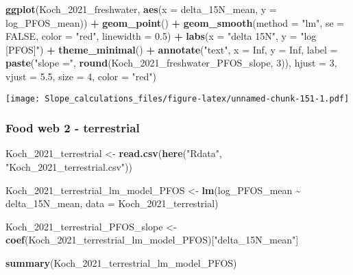 \documentclass[
]{article}
\newenvironment{Shaded}{\begin{snugshade}}{\end{snugshade}}
\newcommand{\AttributeTok}[1]{\textcolor[rgb]{0.13,0.29,0.53}{#1}}
\newcommand{\ConstantTok}[1]{\textcolor[rgb]{0.56,0.35,0.01}{#1}}
\newcommand{\DecValTok}[1]{\textcolor[rgb]{0.00,0.00,0.81}{#1}}
\newcommand{\FloatTok}[1]{\textcolor[rgb]{0.00,0.00,0.81}{#1}}
\newcommand{\FunctionTok}[1]{\textcolor[rgb]{0.13,0.29,0.53}{\textbf{#1}}}
\newcommand{\NormalTok}[1]{#1}
\newcommand{\OtherTok}[1]{\textcolor[rgb]{0.56,0.35,0.01}{#1}}
\newcommand{\SpecialCharTok}[1]{\textcolor[rgb]{0.81,0.36,0.00}{\textbf{#1}}}
\newcommand{\StringTok}[1]{\textcolor[rgb]{0.31,0.60,0.02}{#1}}
\begin{document}
\begin{Shaded}
\begin{Highlighting}[]
\FunctionTok{ggplot}\NormalTok{(Koch\_2021\_freshwater, }\FunctionTok{aes}\NormalTok{(}\AttributeTok{x =}\NormalTok{ delta\_15N\_mean, }\AttributeTok{y =}\NormalTok{ log\_PFOS\_mean)) }\SpecialCharTok{+}
  \FunctionTok{geom\_point}\NormalTok{() }\SpecialCharTok{+}
  \FunctionTok{geom\_smooth}\NormalTok{(}\AttributeTok{method =} \StringTok{"lm"}\NormalTok{, }\AttributeTok{se =} \ConstantTok{FALSE}\NormalTok{, }\AttributeTok{color =} \StringTok{"red"}\NormalTok{, }\AttributeTok{linewidth =} \FloatTok{0.5}\NormalTok{) }\SpecialCharTok{+}
  \FunctionTok{labs}\NormalTok{(}\AttributeTok{x =} \StringTok{"delta 15N"}\NormalTok{,}
       \AttributeTok{y =} \StringTok{"log [PFOS]"}\NormalTok{) }\SpecialCharTok{+}
  \FunctionTok{theme\_minimal}\NormalTok{() }\SpecialCharTok{+}
  \FunctionTok{annotate}\NormalTok{(}\StringTok{"text"}\NormalTok{, }\AttributeTok{x =} \ConstantTok{Inf}\NormalTok{, }\AttributeTok{y =} \ConstantTok{Inf}\NormalTok{, }\AttributeTok{label =} \FunctionTok{paste}\NormalTok{(}\StringTok{"slope ="}\NormalTok{, }\FunctionTok{round}\NormalTok{(Koch\_2021\_freshwater\_PFOS\_slope, }\DecValTok{3}\NormalTok{)), }
           \AttributeTok{hjust =} \DecValTok{3}\NormalTok{, }\AttributeTok{vjust =} \FloatTok{5.5}\NormalTok{, }\AttributeTok{size =} \DecValTok{4}\NormalTok{, }\AttributeTok{color =} \StringTok{"red"}\NormalTok{)}
\end{Highlighting}
\end{Shaded}

\texttt{[image: Slope\_calculations\_files/figure-latex/unnamed-chunk-151-1.pdf]}

\subsubsection{Food web 2 - terrestrial}\label{food-web-2---terrestrial}

\begin{Shaded}
\begin{Highlighting}[]
\NormalTok{Koch\_2021\_terrestrial }\OtherTok{\textless{}{-}} \FunctionTok{read.csv}\NormalTok{(}\FunctionTok{here}\NormalTok{(}\StringTok{"Rdata"}\NormalTok{, }\StringTok{"Koch\_2021\_terrestrial.csv"}\NormalTok{))}

\NormalTok{Koch\_2021\_terrestrial\_lm\_model\_PFOS }\OtherTok{\textless{}{-}} \FunctionTok{lm}\NormalTok{(log\_PFOS\_mean }\SpecialCharTok{\textasciitilde{}}\NormalTok{ delta\_15N\_mean,}
                                         \AttributeTok{data =}\NormalTok{ Koch\_2021\_terrestrial)}

\NormalTok{Koch\_2021\_terrestrial\_PFOS\_slope }\OtherTok{\textless{}{-}} \FunctionTok{coef}\NormalTok{(Koch\_2021\_terrestrial\_lm\_model\_PFOS)[}\StringTok{"delta\_15N\_mean"}\NormalTok{]}

\FunctionTok{summary}\NormalTok{(Koch\_2021\_terrestrial\_lm\_model\_PFOS)}
\end{Highlighting}
\end{Shaded}
\end{document}
